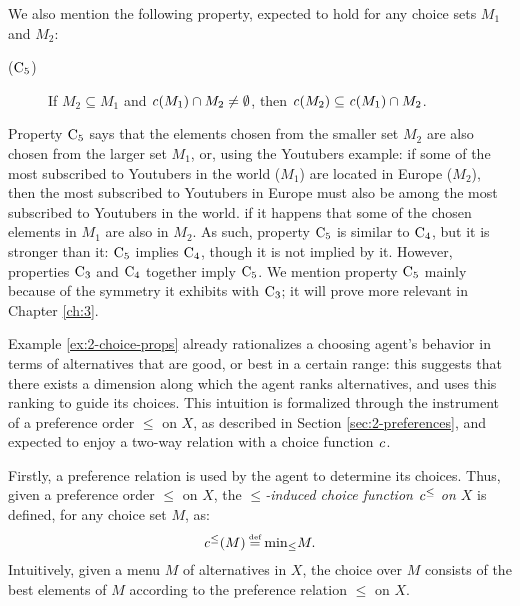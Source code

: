 We also mention the following property, 
expected to hold for any choice sets $M_1$ and $M_{2}$:

\begin{description}
	\item[($\mathrm{C}_{5}$)] If $M_2\subseteq M_1$ and $\mathit{c}(M_1)\cap M_2\neq\emptyset$, 
		then $\mathit{c}(M_2)\subseteq \mathit{c}(M_1)\cap M_2$.
\end{description}

Property $\mathrm{C}_{5}$ says that the elements chosen from the smaller set $M_2$ 
are also chosen from the larger set $M_1$,
or, using the Youtubers example:
if some of the most subscribed to Youtubers in the world ($M_1$) 
are located in Europe ($M_2$),
then the most subscribed to Youtubers in Europe must also be among 
the most subscribed to Youtubers in the world.
if it happens that some of the chosen elements in $M_1$ are also in $M_2$. 
As such, property $\mathrm{C}_{5}$ is similar to $\mathrm{C}_{4}$, but it is stronger than it:
$\mathrm{C}_{5}$ implies $\mathrm{C}_{4}$, though it is not implied by it. 
However, properties $\mathrm{C}_{3}$ and $\mathrm{C}_{4}$ together imply $\mathrm{C}_{5}$.
We mention property $\mathrm{C}_{5}$ mainly because of the symmetry it exhibits
with $\mathrm{C}_{3}$; it will prove more relevant in Chapter \ref{ch:3}.

Example \ref{ex:2-choice-props} already rationalizes a choosing agent's
behavior in terms of alternatives that are good, or best in a certain 
range: this suggests that there exists a dimension along which the 
agent ranks alternatives, and uses this ranking to guide its choices.
This intuition is formalized through the instrument of a preference 
order $\le$ on $X$, as described in Section \ref{sec:2-preferences},
and expected to enjoy a two-way relation with a choice function $\mathit{c}$.

Firstly, a preference relation is used by the agent 
to determine its choices.
Thus, given a preference order $\le$ on $X$, the 
\emph{$\le$-induced choice function $\mathit{c}^{\le}$ on $X$}
is defined, for any choice set $M$, as:
\begin{displaymath}
	\cf^{\le}(M) \defeq \min_{\le}M.
\end{displaymath}
Intuitively, given a menu $M$ of alternatives in $X$,
the choice over $M$ consists of the best elements of $M$
according to the preference relation $\le$ on $X$.

